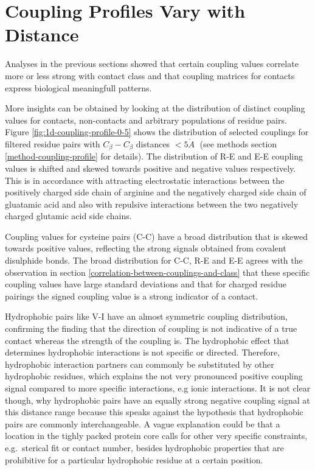 \documentclass[11pt,a4paper,twoside]{book}
\newcommand{\Cb}{C_\beta}
\newcommand{\angstrom}{\mathring{A} \;}
\theoremstyle{definition}
\theoremstyle{definition}
\theoremstyle{remark}
\begin{document}
\section{Coupling Profiles Vary with Distance}\label{coupling-profiles}

Analyses in the previous sections showed that certain coupling values
correlate more or less strong with contact class and that coupling
matrices for contacts express biological meaningfull patterns.

More insights can be obtained by looking at the distribution of distinct
coupling values for contacts, non-contacts and arbitrary populations of
residue pairs. Figure \ref{fig:1d-coupling-profile-0-5} shows the
distribution of selected couplings for filtered residue pairs with
\(\Cb-\Cb\) distances \(< 5\angstrom\) (see methods section
\ref{method-coupling-profile} for details). The distribution of R-E and
E-E coupling values is shifted and skewed towards positive and negative
values respectively. This is in accordance with attracting electrostatic
interactions between the positively charged side chain of arginine and
the negatively charged side chain of gluatamic acid and also with
repulsive interactions between the two negatively charged glutamic acid
side chains.

Coupling values for cysteine pairs (C-C) have a broad distribution that
is skewed towards positive values, reflecting the strong signals
obtained from covalent disulphide bonds. The broad distribution for C-C,
R-E and E-E agrees with the observation in section
\ref{correlation-between-couplings-and-class} that these specific
coupling values have large standard deviations and that for charged
residue pairings the signed coupling value is a strong indicator of a
contact.

Hydrophobic pairs like V-I have an almost symmetric coupling
distribution, confirming the finding that the direction of coupling is
not indicative of a true contact whereas the strength of the coupling
is. The hydrophobic effect that determines hydrophobic interactions is
not specific or directed. Therefore, hydrophobic interaction partners
can commonly be substituted by other hydrophobic residues, which
explains the not very pronounced positive coupling signal compared to
more specific interactions, e.g ionic interactions. It is not clear
though, why hydrophobic pairs have an equally strong negative coupling
signal at this distance range because this speaks against the hypothesis
that hydrophobic pairs are commonly interchangeable. A vague explanation
could be that a location in the tighly packed protein core calls for
other very specific constraints, e.g.~sterical fit or contact number,
besides hydrophobic properties that are prohibitive for a particular
hydrophobic residue at a certain position.
\end{document}
